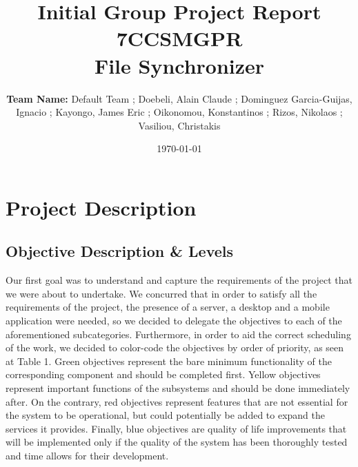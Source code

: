 \documentclass[11pt]{article}
\title{ Initial Group Project Report\\
7CCSMGPR\\[2\baselineskip]
File Synchronizer}
\author{\textbf{Team Name:} Default Team ; Doebeli, Alain Claude ; Dominguez Garcia-Guijas, Ignacio ; Kayongo, James Eric ; 
Oikonomou, Konstantinos ; Rizos, Nikolaos ; Vasiliou, Christakis}
\date{\today}
\begin{document}
\null  %
\nointerlineskip  %
\vfill
\let\snewpage \newpage
\let\newpage \relax
\maketitle
\let \newpage \snewpage
\vfill 
\break %

\section{Project Description}
	\subsection{Objective Description \& Levels}
	Our first goal was to understand and capture the requirements of the project that we were about to undertake. We concurred that in order to satisfy all the requirements of the project, the presence of a server, a desktop and a mobile application were needed, so we decided to delegate the objectives to each of the aforementioned subcategories. Furthermore, in order to aid the correct scheduling of the work, we decided to color-code the objectives by order of priority, as seen at Table 1. Green objectives represent the bare minimum functionality of the corresponding component and should be completed first. Yellow objectives represent important functions of the subsystems and should be done immediately after. On the contrary, red objectives represent features that are not essential for the system to be operational, but could potentially be added to expand the services it provides. Finally, blue objectives are quality of life improvements that will be implemented only if the quality of the system has been thoroughly tested and time allows for their development.\\
\end{document}
